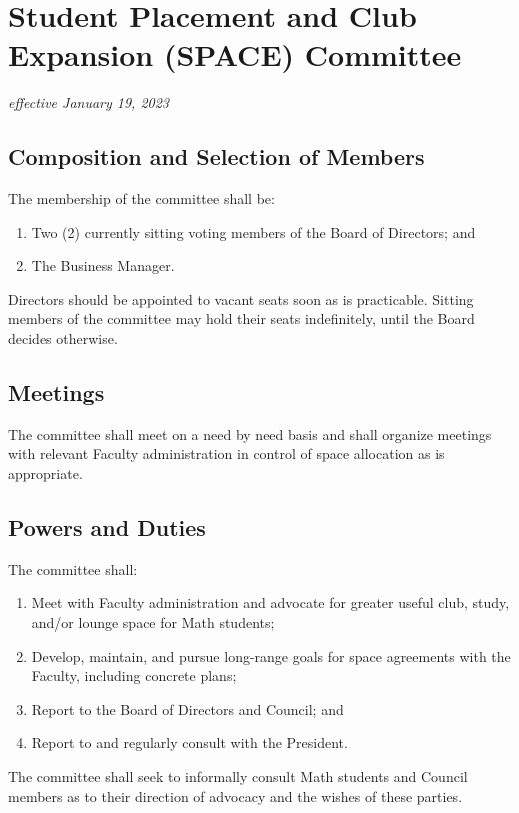\section{Student Placement and Club Expansion (SPACE) Committee}
\emph{effective January 19, 2023}\\

\subsection{Composition and Selection of Members}
The membership of the committee shall be:
\begin{enumerate}
    \item Two (2) currently sitting voting members of the Board of Directors; and
    \item The Business Manager.
\end{enumerate}

Directors should be appointed to vacant seats soon as is practicable. Sitting members of the committee may hold their seats indefinitely, until the Board decides otherwise.

\subsection{Meetings}
The committee shall meet on a need by need basis and shall organize meetings with relevant Faculty administration in control of space allocation as is appropriate.

\subsection{Powers and Duties}
The committee shall: 
\begin{enumerate}
    \item Meet with Faculty administration and advocate for greater useful club, study, and/or lounge space for Math students;
    \item Develop, maintain, and pursue long-range goals for space agreements with the Faculty, including concrete plans;
    \item Report to the Board of Directors and Council; and
    \item Report to and regularly consult with the President.
\end{enumerate}
The committee shall seek to informally consult Math students and Council members as to their direction of advocacy and the wishes of these parties.
